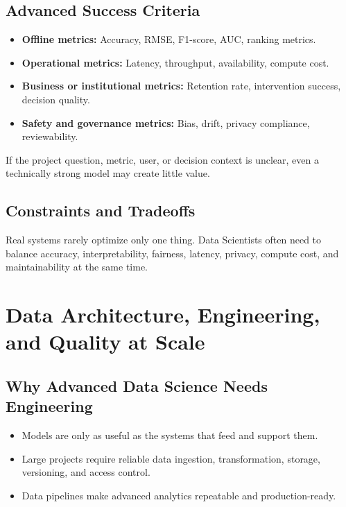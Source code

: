 \documentclass[11pt,a4paper]{article}
\begin{document}
\subsection{Advanced Success Criteria}

\begin{itemize}[leftmargin=*]
  \item \textbf{Offline metrics:} Accuracy, RMSE, F1-score, AUC, ranking metrics.
  \item \textbf{Operational metrics:} Latency, throughput, availability, compute cost.
  \item \textbf{Business or institutional metrics:} Retention rate, intervention success, decision quality.
  \item \textbf{Safety and governance metrics:} Bias, drift, privacy compliance, reviewability.
\end{itemize}

\begin{alertbox}
If the project question, metric, user, or decision context is unclear, even a technically strong model may create little value.
\end{alertbox}

\subsection{Constraints and Tradeoffs}

\begin{conceptbox}
Real systems rarely optimize only one thing. Data Scientists often need to balance accuracy, interpretability, fairness, latency, privacy, compute cost, and maintainability at the same time.
\end{conceptbox}

\section{Data Architecture, Engineering, and Quality at Scale}

\subsection{Why Advanced Data Science Needs Engineering}

\begin{itemize}[leftmargin=*]
  \item Models are only as useful as the systems that feed and support them.
  \item Large projects require reliable data ingestion, transformation, storage, versioning, and access control.
  \item Data pipelines make advanced analytics repeatable and production-ready.
\end{itemize}
\end{document}
